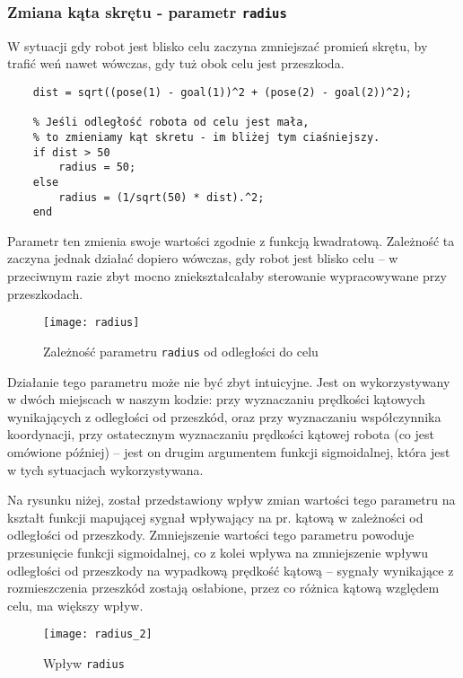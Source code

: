 \documentclass[11pt]{article}
\begin{document}
\subsubsection*{Zmiana kąta skrętu - parametr \texttt{radius}}

W sytuacji gdy robot jest blisko celu zaczyna zmniejszać promień skrętu, by trafić weń nawet wówczas, gdy tuż obok celu jest przeszkoda.
\begin{lstlisting}[firstnumber = 61]
    % Dystans od celu.
    dist = sqrt((pose(1) - goal(1))^2 + (pose(2) - goal(2))^2);
        
    % Jeśli odległość robota od celu jest mała,
    % to zmieniamy kąt skretu - im bliżej tym ciaśniejszy.
    if dist > 50
        radius = 50;
    else
        radius = (1/sqrt(50) * dist).^2;
    end
\end{lstlisting}

Parametr ten zmienia swoje wartości zgodnie z funkcją kwadratową. Zależność ta zaczyna jednak działać dopiero wówczas, gdy robot jest blisko celu -- w przeciwnym razie zbyt mocno zniekształcałaby sterowanie wypracowywane przy przeszkodach.
\begin{figure}[h!]
	\centering
	\texttt{[image: radius]}
	\caption{Zależność parametru \texttt{radius} od odległości do celu}
\end{figure}

Działanie tego parametru może nie być zbyt intuicyjne. Jest on wykorzystywany w dwóch miejscach w naszym kodzie: przy wyznaczaniu prędkości kątowych wynikających z odległości od przeszkód, oraz przy wyznaczaniu współczynnika koordynacji, przy ostatecznym wyznaczaniu prędkości kątowej robota (co jest omówione później) -- jest on drugim argumentem funkcji sigmoidalnej, która jest w tych sytuacjach wykorzystywana.

Na rysunku niżej, został przedstawiony wpływ zmian wartości tego parametru na kształt funkcji mapującej sygnał wpływający na pr. kątową w zależności od odległości od przeszkody. Zmniejszenie wartości tego parametru powoduje przesunięcie funkcji sigmoidalnej, co z kolei wpływa na zmniejszenie wpływu odległości od przeszkody na wypadkową prędkość kątową -- sygnały wynikające z rozmieszczenia przeszkód zostają osłabione, przez co różnica kątową względem celu, ma większy wpływ.

\begin{figure}[h!]
	\centering
	\texttt{[image: radius\_2]}
	\caption{Wpływ \texttt{radius}}
\end{figure}
\end{document}
